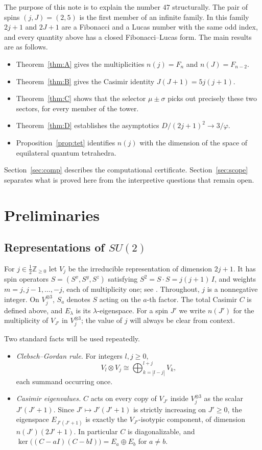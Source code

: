\documentclass[11pt]{amsart}
\theoremstyle{definition}
\theoremstyle{remark}
\begin{document}
The purpose of this note is to explain the number $47$ structurally. The pair of spins $(j,J)=(2,5)$ is the first member of an infinite family. In this family $2j+1$ and $2J+1$ are a Fibonacci and a Lucas number with the same odd index, and every quantity above has a closed Fibonacci--Lucas form. The main results are as follows.
\begin{itemize}
\item Theorem~\ref{thm:A} gives the multiplicities $n(j)=F_n$ and $n(J)=F_{n-2}$.
\item Theorem~\ref{thm:B} gives the Casimir identity $J(J+1)=5j(j+1)$.
\item Theorem~\ref{thm:C} shows that the selector $\mu\pm\sigma$ picks out precisely these two sectors, for every member of the tower.
\item Theorem~\ref{thm:D} establishes the asymptotics $D/(2j+1)^2\to 3/\varphi$.
\item Proposition~\ref{prop:tet} identifies $n(j)$ with the dimension of the space of equilateral quantum tetrahedra.
\end{itemize}
Section~\ref{sec:comp} describes the computational certificate. Section~\ref{sec:scope} separates what is proved here from the interpretive questions that remain open.

\section{Preliminaries}

\subsection{Representations of \texorpdfstring{$SU(2)$}{SU(2)}}
For $j\in\tfrac12\mathbb{Z}_{\ge 0}$ let $V_j$ be the irreducible representation of dimension $2j+1$. It has spin operators $S=(S^x,S^y,S^z)$ satisfying $S^2=S\cdot S=j(j+1)\,I$, and weights $m=j,j-1,\dots,-j$, each of multiplicity one; see \cite{Hall,FultonHarris}. Throughout, $j$ is a nonnegative integer. On $V_j^{\otimes 3}$, $S_a$ denotes $S$ acting on the $a$-th factor. The total Casimir $C$ is defined above, and $E_\lambda$ is its $\lambda$-eigenspace. For a spin $J'$ we write $n(J')$ for the multiplicity of $V_{J'}$ in $V_j^{\otimes 3}$; the value of $j$ will always be clear from context.

Two standard facts will be used repeatedly.
\begin{itemize}
\item \emph{Clebsch--Gordan rule.} For integers $l,j\ge 0$,
\[
V_l\otimes V_j\cong\bigoplus_{k=|l-j|}^{l+j}V_k,
\]
each summand occurring once.
\item \emph{Casimir eigenvalues.} $C$ acts on every copy of $V_{J'}$ inside $V_j^{\otimes 3}$ as the scalar $J'(J'+1)$. Since $J'\mapsto J'(J'+1)$ is strictly increasing on $J'\ge 0$, the eigenspace $E_{J'(J'+1)}$ is exactly the $V_{J'}$-isotypic component, of dimension $n(J')(2J'+1)$. In particular $C$ is diagonalizable, and $\ker\bigl((C-aI)(C-bI)\bigr)=E_a\oplus E_b$ for $a\ne b$.
\end{itemize}
\end{document}
